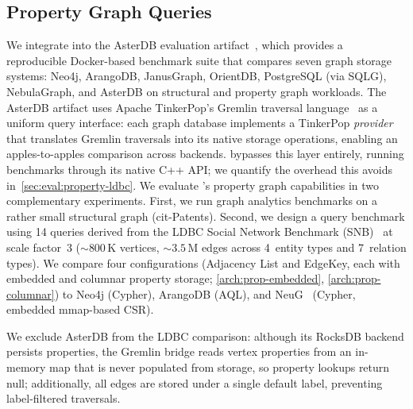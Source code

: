 \subsection{Property Graph Queries}
\label{sec:eval:property}

We integrate \project{} into the AsterDB evaluation artifact~\cite{moAsterEnhancingLSMstructures2025}, which provides a reproducible Docker-based benchmark suite that compares seven graph storage systems: Neo4j, ArangoDB, JanusGraph, OrientDB, PostgreSQL (via SQLG), NebulaGraph, and AsterDB on structural and property graph workloads.
The AsterDB artifact uses Apache TinkerPop's Gremlin traversal language~\cite{apachetinkerpop} as a uniform query interface: each graph database implements a TinkerPop \emph{provider} that translates Gremlin traversals into its native storage operations, enabling an apples-to-apples comparison across backends.
\project{} bypasses this layer entirely, running benchmarks through its native C++ API; we quantify the overhead this avoids in~\autoref{sec:eval:property-ldbc}.
We evaluate \project{}'s property graph capabilities in two complementary experiments.
First, we run graph analytics benchmarks on a rather small structural graph (cit-Patents).
Second, we design a query benchmark using 14 queries derived from the LDBC Social Network Benchmark (SNB)~\cite{erling2015ldbc} at scale factor~3 (${\sim}800$\,K vertices, ${\sim}3.5$\,M edges across 4~entity types and 7~relation types).
We compare four \project{} configurations (Adjacency List and EdgeKey, each with embedded and columnar property storage; \autoref{arch:prop-embedded}, \autoref{arch:prop-columnar}) to Neo4j (Cypher), ArangoDB (AQL), and NeuG~\cite{NeuG2025Alibaba} (Cypher, embedded mmap-based CSR).

We exclude AsterDB from the LDBC comparison: although its RocksDB backend persists properties, the Gremlin bridge reads vertex properties from an in-memory map that is never populated from storage, so property lookups return null; additionally, all edges are stored under a single default label, preventing label-filtered traversals.

